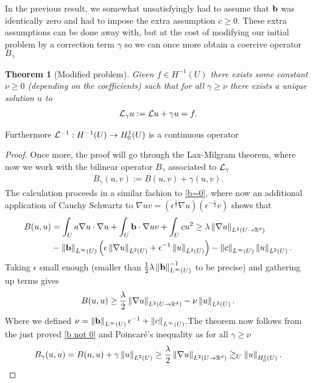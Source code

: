 \documentclass[12pt]{article}
\newtheorem{theorem}{Theorem}[section]
\theoremstyle{definition}
\renewcommand{\norm}[1]{\left\lVert #1 \right\rVert}\renewcommand{\abs}[1]{\left| #1 \right|}
\newcommand{\qt}[1]{\left(#1\right)}
\begin{document}
In the previous result, we somewhat unsatisfyingly had to assume that $ \vb{b}$ was identically zero and had to impose the extra assumption  $c \geq 0$. These extra assumptions can be done away with, but at the cost of modifying our initial problem by a correction term $\gamma $ so we can once more obtain a coercive operator $B_\gamma $
\begin{theorem}[Modified problem]\label{mod}
	Given $f \in  H^{-1}(U)$ there exists some constant $\nu \geq 0$ (depending on the coefficients) such that for all $\gamma \geq \nu$  there exists a unique solution $u$ to
	\begin{align*}
		\mathcal{L}_\gamma u:= \mathcal{L} u+ \gamma u=f.
	\end{align*}
\end{theorem}
Furthermore $\mathcal{L}^{-1}: H^{-1}(U) \to H^1_0(U)$ is a continuous operator
\begin{proof}
	Once more, the proof will go through the Lax-Milgram theorem, where now we work with the bilinear operator $B_\gamma  $ associated to $\mathcal{L}_\gamma  $
	\begin{align*}
		B_\gamma  (u,v):= B(u,v) + \gamma  (u,v).
	\end{align*}
	The calculation proceeds in a similar fashion to  \eqref{b=0}, where now an additional application of Cauchy Schwartz to $\nabla u v = (\epsilon^{\frac{1}{2}} \nabla u)(\epsilon^{-\frac{1}{2}}v)$  shows that
	\begin{align*}
		B(u,u) & = \int_{U}a \nabla u \cdot \nabla u + \int_{U} \vb{b}\cdot  \nabla u v +  \int_{U} cu^2 \geq \lambda \norm{\nabla u}_{L^2(U \to \R^d)}           \\
		       & - \norm{\vb{b}}_{L^\infty(U)} \qt{\epsilon \norm{\nabla u}_{L^2(U)}+ \epsilon ^{-1}\norm{u}_{L^2(U)}}- \norm{c}_{L^\infty(U)}\norm{u}_{L^2(U)} .
	\end{align*}
	Taking $\epsilon $ small enough (smaller than $\frac{1}{2} \lambda \norm{\vb{b}}_{L^\infty(U)}^{-1}$ to be precise) and gathering up terms gives
	\begin{align}\label{b not 0}
		B(u,u) \geq \frac{\lambda}{2} \norm{\nabla u}_{L^2(U \to \R^d)} -\nu \norm{u}_{L^2(U)}.
	\end{align}
	Where we defined $\nu = \norm{\vb{b}}_{L^\infty(U)} \epsilon ^{-1}+\norm{c}_{L^\infty(U)}$.The theorem now follows from the just proved \eqref{b not 0} and Poincaré's inequality as for all $\gamma \geq \nu$
	\begin{align*}
		B_\gamma (u,u)=B(u,u)+ \gamma \norm{u}_{L^2(U)} \geq\frac{\lambda}{2} \norm{\nabla u}_{L^2(U \to \R^d)}\gtrsim _U \norm{u}_{H_0^1(U)} .
	\end{align*}
\end{proof}
\end{document}
